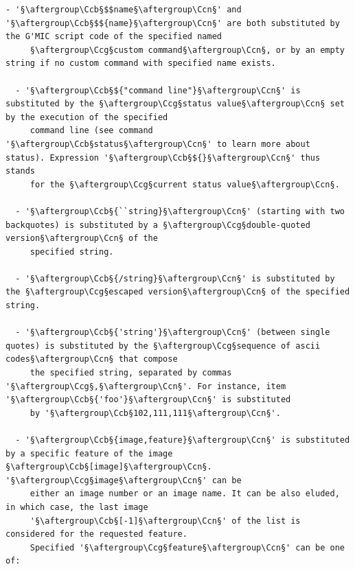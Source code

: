 \documentclass[a4paper,10.5pt,twoside]{book}
\def\Ccb{\color{cb}}
\def\Ccg{\color{cc}}
\def\Ccn{\color{black}}
\begin{document}
\begin{lstlisting}[escapechar=§]
  - '§\aftergroup\Ccb§$$name§\aftergroup\Ccn§' and '§\aftergroup\Ccb§$${name}§\aftergroup\Ccn§' are both substituted by the G'MIC script code of the specified named 
     §\aftergroup\Ccg§custom command§\aftergroup\Ccn§, or by an empty string if no custom command with specified name exists. 
 
  - '§\aftergroup\Ccb§${"command line"}§\aftergroup\Ccn§' is substituted by the §\aftergroup\Ccg§status value§\aftergroup\Ccn§ set by the execution of the specified 
     command line (see command '§\aftergroup\Ccb§status§\aftergroup\Ccn§' to learn more about status). Expression '§\aftergroup\Ccb§${}§\aftergroup\Ccn§' thus stands 
     for the §\aftergroup\Ccg§current status value§\aftergroup\Ccn§. 
 
  - '§\aftergroup\Ccb§{``string}§\aftergroup\Ccn§' (starting with two backquotes) is substituted by a §\aftergroup\Ccg§double-quoted version§\aftergroup\Ccn§ of the 
     specified string. 
 
  - '§\aftergroup\Ccb§{/string}§\aftergroup\Ccn§' is substituted by the §\aftergroup\Ccg§escaped version§\aftergroup\Ccn§ of the specified string. 
 
  - '§\aftergroup\Ccb§{'string'}§\aftergroup\Ccn§' (between single quotes) is substituted by the §\aftergroup\Ccg§sequence of ascii codes§\aftergroup\Ccn§ that compose 
     the specified string, separated by commas '§\aftergroup\Ccg§,§\aftergroup\Ccn§'. For instance, item '§\aftergroup\Ccb§{'foo'}§\aftergroup\Ccn§' is substituted 
     by '§\aftergroup\Ccb§102,111,111§\aftergroup\Ccn§'. 
 
  - '§\aftergroup\Ccb§{image,feature}§\aftergroup\Ccn§' is substituted by a specific feature of the image §\aftergroup\Ccb§[image]§\aftergroup\Ccn§. '§\aftergroup\Ccg§image§\aftergroup\Ccn§' can be 
     either an image number or an image name. It can be also eluded, in which case, the last image 
     '§\aftergroup\Ccb§[-1]§\aftergroup\Ccn§' of the list is considered for the requested feature. 
     Specified '§\aftergroup\Ccg§feature§\aftergroup\Ccn§' can be one of: 
 

\end{lstlisting}
\end{document}

